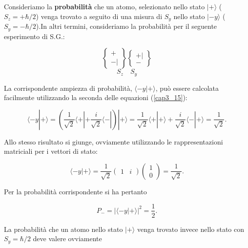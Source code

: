 Consideriamo la \textbf{probabilità} che un atomo, selezionato nello stato $| + \rangle$ ($S_z=+\hbar/2$) venga trovato a seguito di una misura di $S_y$ nello stato $| -y \rangle$ ($S_y=-\hbar/2$).In altri termini, consideriamo la probabilità per il seguente esperimento di S.G.:

\begin{equation}
\begin{Bmatrix}
 + \\ - |  
\end{Bmatrix}
\begin{Bmatrix}
 + | \\ -  
\end{Bmatrix}
\end{equation}
\begin{equation}
S_z \quad S_y
\end{equation}

La corrispondente ampiezza di probabilità, $\langle -y | + \rangle$, può essere calcolata facilmente utilizzando la seconda delle equazioni (\ref{cap3_15}):

\begin{equation}
\langle -y | + \rangle = \left( \frac{1}{\sqrt{2}}\langle + |  + \frac{i}{\sqrt{2}}\langle - |  \right ) |+ \rangle = \frac{1}{\sqrt{2}}\langle + | + \rangle +\frac{i}{\sqrt{2}}\langle - | + \rangle = \frac{1}{\sqrt{2}} .
\end{equation}

Allo stesso risultato si giunge, ovviamente utilizzando le rappresentazioni matriciali per i vettori di stato:

\begin{equation}
\langle -y | + \rangle= \frac{1}{\sqrt{2}}
\begin{pmatrix}
1 & i
\end{pmatrix}
\begin{pmatrix}
1 \\
0
\end{pmatrix}=
\frac{1}{\sqrt{2}} .
\end{equation}

Per la probabilità corrispondente si ha pertanto

\begin{equation}
P_-= |\langle -y | + \rangle |^2=\frac{1}{2} .
\end{equation}

La probabilità che un atomo nello stato $| + \rangle $  venga trovato invece nello stato con $S_y=\hbar/2$ deve valere ovviamente

